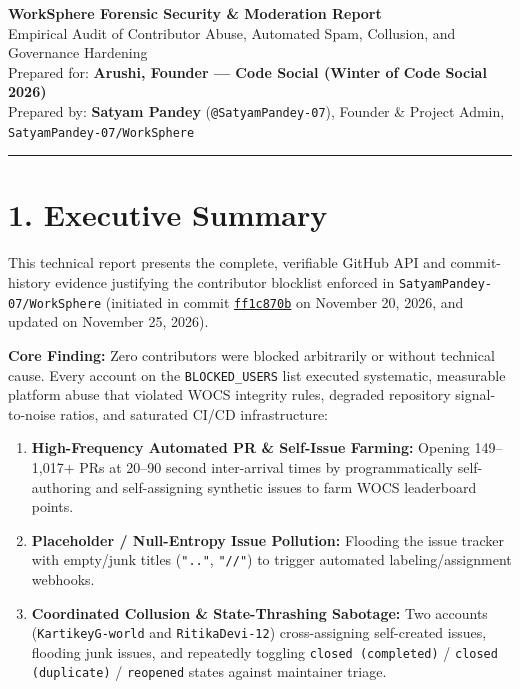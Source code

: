 \documentclass[11pt,a4paper]{article}
\begin{document}
\begin{center}
{\LARGE\bfseries\color{primary} WorkSphere Forensic Security \& Moderation Report}\\[6pt]
{\large\color{muted} Empirical Audit of Contributor Abuse, Automated Spam, Collusion, and Governance Hardening}\\[4pt]
{\small Prepared for: \textbf{Arushi, Founder — Code Social (Winter of Code Social 2026)}}\\
{\small Prepared by: \textbf{Satyam Pandey} (\texttt{@SatyamPandey-07}), Founder \& Project Admin, \texttt{SatyamPandey-07/WorkSphere}}
\end{center}

\vspace{6pt}
\hrule
\vspace{10pt}

\section{1. Executive Summary}
This technical report presents the complete, verifiable GitHub API and commit-history evidence justifying the contributor blocklist enforced in \texttt{SatyamPandey-07/WorkSphere} (initiated in commit \href{https://github.com/SatyamPandey-07/WorkSphere/commit/ff1c870b86fd0c1886e3c7a66f1096ae4397f4dd}{\texttt{ff1c870b}} on November 20, 2026, and updated on November 25, 2026).

\textbf{Core Finding:} Zero contributors were blocked arbitrarily or without technical cause. Every account on the \texttt{BLOCKED\_USERS} list executed systematic, measurable platform abuse that violated WOCS integrity rules, degraded repository signal-to-noise ratios, and saturated CI/CD infrastructure:
\begin{enumerate}[leftmargin=1.5em, itemsep=3pt]
  \item \textbf{High-Frequency Automated PR \& Self-Issue Farming:} Opening 149--1,017+ PRs at 20--90 second inter-arrival times by programmatically self-authoring and self-assigning synthetic issues to farm WOCS leaderboard points.
  \item \textbf{Placeholder / Null-Entropy Issue Pollution:} Flooding the issue tracker with empty/junk titles (\texttt{".."}, \texttt{"//"}) to trigger automated labeling/assignment webhooks.
  \item \textbf{Coordinated Collusion \& State-Thrashing Sabotage:} Two accounts (\texttt{KartikeyG-world} and \texttt{RitikaDevi-12}) cross-assigning self-created issues, flooding junk issues, and repeatedly toggling \texttt{closed (completed)} / \texttt{closed (duplicate)} / \texttt{reopened} states against maintainer triage.
\end{enumerate}
\end{document}
